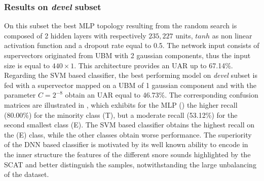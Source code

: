 \begin{table}[h]
\end{table}


\subsubsection{Results on \textit{devel} subset}
On this subset the best MLP topology resulting from the random search is composed of 2 hidden layers with respectively ${235,227}$ units, $tanh$ as non linear activation function and a dropout rate equal to 0.5. The network input consists of supervectors originated from UBM with 2 gaussian components, thus the input size is equal to $440 \times 1$. This architecture provides an UAR up to 67.14\%. Regarding the SVM based classifier, the best performing model on \textit{devel} subset is fed with a supervector mapped on a UBM of 1 gaussian component and with the parameter $C=2^{-8}$ obtain an UAR equal to 46.73\%.
The corresponding confusion matrices are illustrated in , which exhibits for the MLP () the higher recall (80.00\%) for the minority class (T), but a moderate recall (53.12\%) for the second smallest class (E). The SVM based classifier obtains the highest recall on the (E) class, while the other classes obtain worse performance. The superiority of the DNN based classifier is motivated by its well known ability to encode in the inner structure the features of the different snore sounds highlighted by the SCAT and better distinguish the samples, notwithstanding the large unbalancing of the dataset. 

